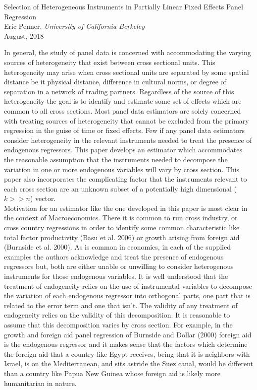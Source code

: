 \documentclass[10pt]{article}
\begin{document}
\begin{center}
\doublespacing
\Large Selection of Heterogeneous Instruments in Partially Linear
Fixed Effects Panel Regression \\ 
\vspace{0.25cm}
\large Eric Penner, \emph{University of California Berkeley} \rm \\
\large August, 2018
\end{center}
\doublespacing
\noindent In general, the study of panel data is concerned with accommodating the varying sources of heterogeneity that exist between cross sectional units. This heterogeneity may arise when cross sectional units are separated by some spatial distance be it physical distance, difference in cultural norms, or degree of separation in a network of trading partners. Regardless of the source of this heterogeneity the goal is to identify and estimate some set of effects which are common to all cross sections. Most panel data estimators are solely concerned with treating sources of heterogeneity that cannot be excluded from the primary regression in the guise of time or fixed effects. Few if any panel data estimators consider heterogeneity in the relevant instruments needed to treat the presence of endogenous regressors. This paper develops an estimator which accommodates the reasonable assumption that the instruments needed to decompose the variation in one or more endogenous variables will vary by cross section. This paper also incorporates the complicating factor that the instruments relevant to each cross section are an unknown subset of a potentially high dimensional ($k>>n$) vector.\\ 

\noindent Motivation for an estimator like the one developed in this paper is most clear in the context of Macroeconomics. There it is common to run cross industry, or cross country regressions in order to identify some common characteristic like total factor productivity (Basu et al. 2006) or growth arising from foreign aid (Burnside et al. 2000). As is common in economics, in each of the supplied examples the authors acknowledge and treat the presence of endogenous regressors but, both are either unable or unwilling to consider heterogenous instruments for those endogenous variables. It is well understood that the treatment of endogeneity relies on the use of instrumental variables to decompose the variation of each endogenous regressor into orthogonal parts, one part that is related to the error term and one that isn't. The validity of any treatment of endogeneity relies on the validity of this decomposition. It is reasonable to assume that this decomposition varies by cross section. For example, in the growth and foreign aid panel regression of Burnside and Dollar (2000) foreign aid is the endogenous regressor and it makes sense that the factors which determine the foreign aid that a country like Egypt receives, being that it is neighbors with Israel, is on the Mediterranean, and sits astride the Suez canal, would be different than a country like Papua New Guinea whose foreign aid is likely more humanitarian in nature.            \\
   
\end{document}
